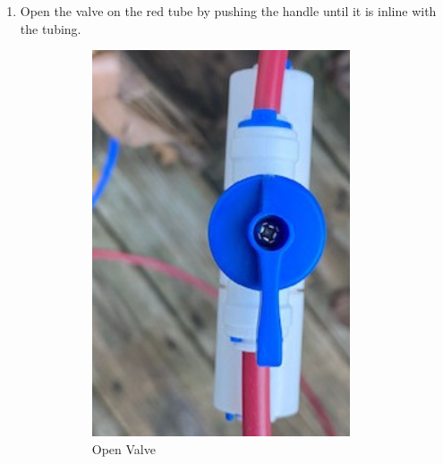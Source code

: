 \documentclass{report}
\begin{document}
\begin{enumerate}
    \item Open the valve on the red tube by pushing the handle until it is inline with the tubing. 
    \begin{figure}[H]
        \centering
        \begin{subfigure}{0.5\textwidth}
            \centering
            \includegraphics[width=0.9\textwidth]{ValveOpen.jpg}
            \caption{Open Valve}
        \end{subfigure}%
        \begin{subfigure}{0.5\textwidth}
            \centering

\end{subfigure}
\end{figure}
\end{enumerate}
\end{document}
